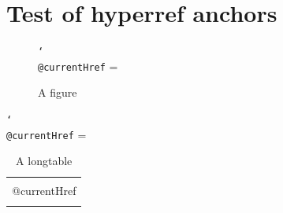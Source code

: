 \documentclass{article}
\DeclareRobustCommand\cs[1]{\texttt{\char`\\#1}}
\begin{document}
\section*{Test of hyperref anchors}

\begin{figure}[!ht]
\caption{A figure}
\centering
\makeatletter
\cs{@currentHref} = \@currentHref
\makeatother
\end{figure}

\begin{table}[!ht]
\caption{A table}
\centering
\makeatletter
\cs{@currentHref} = \@currentHref
\makeatother
\end{table}

\begin{longtable}{c}
\caption{A longtable}\\
\makeatletter
\cs{@currentHref} = \@currentHref\\
\makeatother
\end{longtable}
\end{document}
